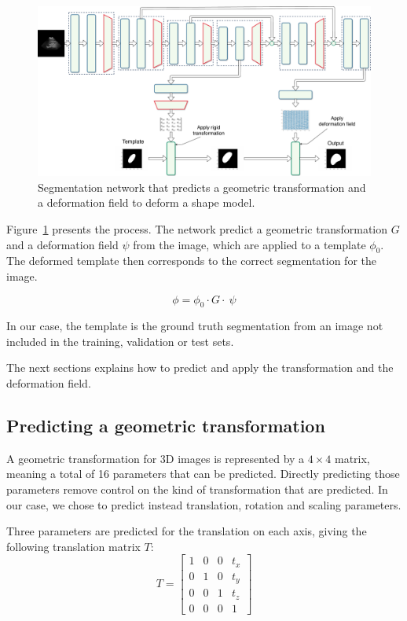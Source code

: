 \begin{figure}[htbp]
	\includegraphics[width=\textwidth]{img_seg/deformation_network}
    \caption{Segmentation network that predicts a geometric transformation and a deformation field to deform a shape model.}
    \label{fig:deform_network}
\end{figure}

Figure~\ref{fig:deform_network} presents the process. The network predict a geometric transformation $G$ and a deformation field $\psi$ from the image, which are applied to a template $\phi_0$. The deformed template then corresponds to the correct segmentation for the image.

\begin{equation}
    \phi = \phi_0 \cdot G \cdot \ \psi
\end{equation}

In our case, the template is the ground truth segmentation from an image not included in the training, validation or test sets.

The next sections explains how to predict and apply the transformation and the deformation field.

\subsection{Predicting a geometric transformation}

A geometric transformation for 3D images is represented by a $4 \times 4$ matrix, meaning a total of 16 parameters that can be predicted. Directly predicting those parameters remove control on the kind of transformation that are predicted. In our case, we chose to predict instead translation, rotation and scaling parameters. 

Three parameters are predicted for the translation on each axis, giving the following translation matrix $T$:
\begin{equation*}
    T = 
    \begin{bmatrix}
        1 & 0 & 0 & t_x \\
        0 & 1 & 0 & t_y \\
        0 & 0 & 1 & t_z \\ 
        0 & 0 & 0 & 1
    \end{bmatrix}
\end{equation*}

